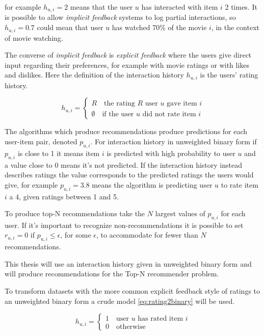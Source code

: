 for example $h_{u, i} = 2$ means that the user $u$ has interacted with item $i$ 2 times. It is possible to allow \textit{implicit feedback} systems to log partial interactions, so $h_{u, i} = 0.7$ could mean that user $u$ has watched 70\% of the movie $i$, in the context of movie watching. \citep{hu2008collaborative}

The converse of \textit{implicit feedback} is \textit{explicit feedback} where the users give direct input regarding their preferences, for example with movie ratings or with likes and dislikes.  Here the definition of the interaction history $h_{u, i}$ is the users' rating history.

\begin{equation}
    h_{u, i} = \begin{cases}
        R \quad \text{the rating $R$ user $u$ gave item $i$} \\
        \emptyset \quad \text{if the user $u$ did not rate item $i$}
    \end{cases}
\end{equation}


The algorithms which produce recommendations produce predictions for each user-item pair, denoted $p_{u, i}$. For interaction history in unweighted binary form if $p_{u, i}$ is close to 1 it means item $i$ is predicted with high probability to user $u$ and a value close to 0 means it's not predicted. If the interaction history instead describes ratings the value corresponds to the predicted ratings the users would give, for example $p_{u, i} = 3.8$ means the algorithm is predicting user $u$ to rate item $i$ a 4, given ratings between 1 and 5.

To produce top-N recommendations take the $N$ largest values of $p_{u, i}$ for each user. If it's important to recognize non-recommendations it is possible to set $r_{u, i} = 0$ if $p_{u, i} \leq \epsilon$, for some $\epsilon$, to accommodate for fewer than $N$ recommendations.

This thesis will use an interaction history given in unweighted binary form and will produce recommendations for the Top-N recommender problem.

To transform datasets with the more common explicit feedback style of ratings to an unweighted binary form a crude model \eqref{eq:rating2binary} will be used.

\begin{equation} \label{eq:rating2binary}
    h_{u, i} = \begin{cases}
        1 \quad \text{user $u$ has rated item $i$} \\
        0 \quad \text{otherwise}
    \end{cases}
\end{equation}

